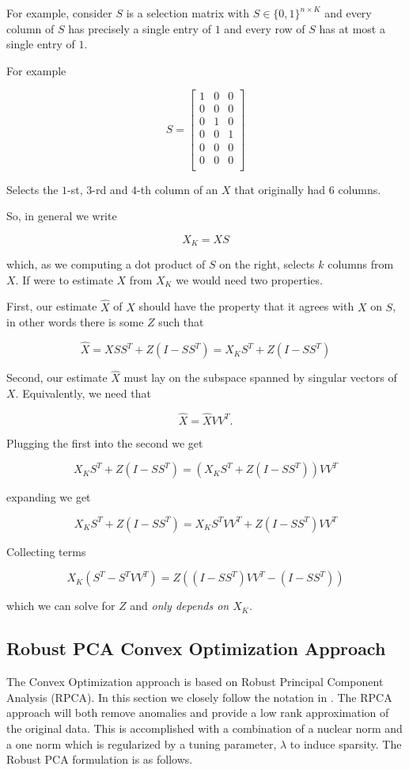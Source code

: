 \documentclass[conference]{IEEEtran}
\begin{document}
For example, consider $S$ is a selection matrix with $S \in \{0,1\}^{n \times K}$ and every column of $S$ has precisely a single entry of $1$ and every row of $S$ has at most a single entry of $1$.

For example

$$
S = 
\begin{bmatrix}
1 & 0 & 0 \\
0 & 0 & 0 \\
0 & 1 & 0 \\
0 & 0 & 1 \\
0 & 0 & 0 \\
0 & 0 & 0 \\
\end{bmatrix}
$$

Selects the $1$-st, $3$-rd and $4$-th column of an $X$ that originally had $6$ columns.

So, in general we write 

$$X_K = X S$$

\noindent which, as we computing a dot product of $S$ on the right, selects $k$ columns from $X$.
If were to estimate $X$ from $X_K$ we would need two properties.

First, our estimate $\hat{X}$ of $X$ should have the property that it agrees with $X$ on $S$, in other words there is some $Z$ such that

$$
\hat{X} = X S S^T + Z (I-S S^T) = X_K S^T + Z (I-S S^T)
$$

Second, our estimate $\hat{X}$ must lay on the subspace spanned by singular vectors of $X$.  Equivalently, we need that

$$
\hat{X} = \hat{X} V V^T.
$$

Plugging the first into the second we get

$$
X_K S^T + Z (I-S S^T) = (X_K S^T + Z (I-S S^T)) V V^T 
$$

expanding we get 

$$
X_K S^T + Z (I-S S^T) = X_K S^T V V^T + Z (I-S S^T)V V^T
$$

Collecting terms

$$
X_K (S^T - S^T V V^T) = Z ((I-S S^T)V V^T - (I-S S^T))
$$

which we can solve for $Z$ and \emph{only depends on $X_K$}.

\subsection{Robust PCA Convex Optimization Approach}
The Convex Optimization approach is based on Robust Principal Component Analysis (RPCA). In this section we closely follow the notation in \cite{Paffenroth2012a,Paffenroth2013b,paffenroth2018robust}. The RPCA approach will both remove anomalies and provide a low rank approximation of the original data. This is accomplished with a combination of a nuclear norm and a one norm which is regularized by a tuning parameter, $\lambda$ to induce sparsity. The Robust PCA formulation is as follows.
\end{document}
